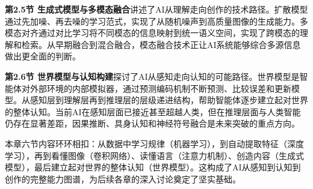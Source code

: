 \textbf{第2.5节 生成式模型与多模态融合}讲述了AI从理解走向创作的技术路径。扩散模型通过先加噪、再去噪的学习范式，实现了从随机噪声到高质量图像的生成能力。多模态对齐通过对比学习将不同模态的信息映射到统一语义空间，实现了跨模态的理解和检索。从早期融合到混合融合，模态融合技术正让AI系统能够综合多源信息做出更全面的判断。

\textbf{第2.6节 世界模型与认知构建}探讨了AI从感知走向认知的可能路径。世界模型是智能体对外部环境的内部模拟器，通过预测编码机制不断预测、比较误差和更新模型。从感知层到理解层再到推理层的层级递进结构，帮助智能体逐步建立起对世界的整体认知。当前AI在感知层面已接近甚至超越人类，但在推理层面与人类智能仍存在显著差距，因果推断、具身认知和神经符号融合是未来突破的重点方向。

本章六节内容环环相扣：从数据中学习规律（机器学习），到自动提取特征（深度学习），再到看懂图像（卷积网络）、读懂语言（注意力机制）、创造内容（生成式模型），最后建立起对世界的整体认知（世界模型）。这构成了AI从感知到认知到创作的完整能力图谱，为后续各章的深入讨论奠定了坚实基础。

